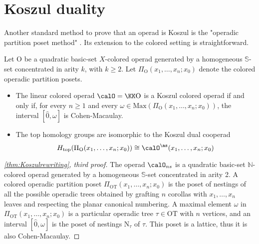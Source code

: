 
\section{Koszul duality} 
\label{s:koszul}



Another standard method to prove that an operad is Koszul is the "operadic partition poset method" \cite[Section 8.7]{LodayVallette12}. Its extension to the colored setting is straightforward.

\begin{thm} \label{thm:koszulmacaulay} Let $\mathrm{O}$ be a quadratic basic-set $X$-colored operad generated by a homogeneous $\mathbb{S}$-set concentrated in arity $k$, with $k\geq 2$. Let $\Pi_{\mathrm{O}}(x_1,\ldots,x_n;x_0)$ denote the colored operadic partition posets.
\begin{itemize}
    \item The linear colored operad $\calO=\KK\mathrm{O}$ is a Koszul colored operad if and only if, for every $n\geq 1$ and every $\omega \in \mathrm{Max}(\Pi_{\mathrm{O}}(x_1,\ldots,x_n;x_0))$, the interval $[\hat 0,\omega]$ is Cohen-Macaulay. 
    \item The top homology groups are isomorphic to the Koszul dual cooperad \[H_{\mathrm{top}}(\Pi_{\mathrm{O}}(x_1,\ldots,x_n;x_0))\cong \calO^{\as}(x_1,\ldots,x_n;x_0) \]
\end{itemize}
\end{thm}


\begin{proof}[{\cref{thm:Koszulrewriting}}, third proof] The operad $\calO_{ns}$ is a quadratic basic-set $\mathbb{N}$-colored operad generated by a homogeneous $\mathbb{S}$-set concentrated in arity 2. A colored operadic partition poset $\Pi_{\mathrm{OT}}(x_1,\ldots,x_n;x_0)$ is the poset of nestings of all the possible operadic trees obtained by grafting $n$ corollas with $x_1,\ldots,x_n$ leaves and respecting the planar canonical numbering. A maximal element $\omega$ in $\Pi_{\mathrm{OT}}(x_1,\ldots,x_n;x_0)$ is a particular operadic tree $\tau \in \mathrm{OT}$ with $n$ vertices, and an interval $[\hat 0,\omega]$ is the poset of nestings $\mathrm{N}_\tau$ of $\tau$. This poset is a lattice, thus it is also Cohen-Macaulay. 
\end{proof}

